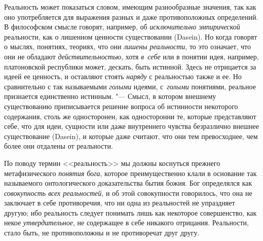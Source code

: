 
\label{bkm:bm73a}Реальность может показаться словом, имеющим разнообразные
значения, так как оно употребляется для выражения разных и даже противоположных
определений. В философском смысле говорят, например, об {\em исключительно
эмпирической} реальности, как о лишенном ценности существовании (Dasein). Но
когда говорят о мыслях, понятиях, теориях, что они {\em лишены реальности}, то
это означает, что они не обладают {\em действительностью}, хотя {\em в~себе}
или в понятии идея, например, платоновской республики может, дескать, быть
истинной. Здесь не отрицается за идеей ее ценность, и оставляют стоять
{\em наряду} с реальностью также и ее. Но сравнительно с так называемыми
{\em голыми} идеями, с~{\em голыми} понятиями, реальное признается единственно
истинным. "--- Смысл, в котором внешнему существованию приписывается решение
вопроса об истинности некоторого содержания, столь же односторонен, как
односторонни те, которые представляют себе, что для идеи, сущности или даже
внутреннего чувства безразлично внешнее существование (Dasein), и которые даже
считают, что они тем превосходнее, чем более они отдалены от реальности.

По поводу термин <<реальность>> мы должны коснуться прежнего метафизического
{\em понятия бога}, которое преимущественно клали в основание так называемого
онтологического доказательства бытия божия. Бог определялся как
{\em совокупность всех реальностей}, и об этой совокупности говорилось, что она
не заключает в себе противоречия, что ни одна из реальностей не упраздняет
другую; ибо реальность следует понимать лишь как некоторое совершенство, как
некое {\em утвердительное}, не содержащее в себе никакого отрицания.
Реальности, стало быть, не противоположны и не противоречат друг другу.

